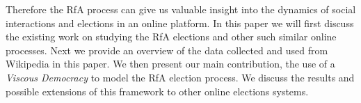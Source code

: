 Therefore the RfA process can give us valuable insight into the dynamics of social interactions and elections in an online platform. In this paper we will first discuss the existing work on studying the RfA elections and other such similar online processes. Next we provide an overview of the data collected and used from Wikipedia in this paper. We then present our main contribution, the use of a \textit{Viscous Democracy} to model the RfA election process. We discuss the results and possible extensions of this framework to other online elections systems.  


